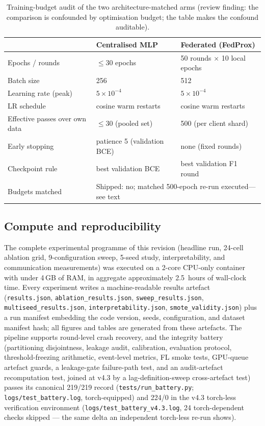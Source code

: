 \begin{table}[t]
\centering
\caption{Training-budget audit of the two architecture-matched arms
(review finding: the comparison is confounded by optimisation budget;
the table makes the confound auditable).}
\label{tab:budget}
\small
\begin{tabularx}{0.94\textwidth}{@{}>{\raggedright\arraybackslash}X l l@{}}
\toprule
 & \textbf{Centralised MLP} & \textbf{Federated (FedProx)} \\
\midrule
Epochs / rounds & $\le$30 epochs & 50 rounds $\times$ 10 local epochs \\
Batch size & 256 & 512 \\
Learning rate (peak) & $5\times10^{-4}$ & $5\times10^{-4}$ \\
LR schedule & cosine warm restarts & cosine warm restarts \\
Effective passes over own data & $\le$30 (pooled set) & 500 (per client shard) \\
Early stopping & patience 5 (validation BCE) & none (fixed rounds) \\
Checkpoint rule & best validation BCE & best validation F1 round \\
Budgets matched & \multicolumn{2}{l}{Shipped: no; matched 500-epoch re-run executed---see text} \\
\bottomrule
\end{tabularx}
\end{table}

\subsection{Compute and reproducibility}
\label{sec:repro}

The complete experimental programme of this revision (headline run,
24-cell ablation grid, 9-configuration sweep, 5-seed study,
interpretability, and communication measurements) was executed on a
2-core CPU-only container with under 4\,GB of RAM, in aggregate
approximately 2.5~hours of wall-clock time. Every experiment writes a
machine-readable results artefact (\texttt{results.json},
\texttt{ablation\_results.json}, \texttt{sweep\_results.json},
\texttt{multiseed\_results.json}, \texttt{interpretability.json},
\texttt{smote\_validity.json}) plus a run manifest embedding the code
version, seeds, configuration, and dataset manifest hash; all figures
and tables are generated from these artefacts. The pipeline supports
round-level crash recovery, and the integrity battery (partitioning
disjointness, leakage audit, calibration, evaluation protocol,
threshold-freezing arithmetic, event-level metrics, FL smoke tests,
GPU-queue artefact guards, a leakage-gate failure-path test, and an
audit-artefact recomputation test, joined at v4.3 by a
lag-definition-sweep cross-artefact test)
passes its canonical 219/219 record (\texttt{tests/run\_battery.py};
\texttt{logs/test\_battery.log}, torch-equipped) and 224/0 in the
v4.3 torch-less verification environment
(\texttt{logs/test\_battery\_v4.3.log}, 24 torch-dependent checks
skipped --- the same delta an independent torch-less re-run shows).

